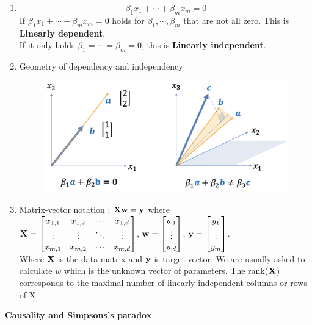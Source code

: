 \begin{enumerate}
    \item \[\beta_1 x_1+\cdots+\beta_m x_m = 0\] 
    If \(\beta_1 x_1+\cdots+\beta_m x_m = 0\) holds for $\beta_1 ,\cdots,\beta_m$ that are not all zero. This is \textbf{Linearly dependent}.\\
    If it only holds \(\beta_1 = \cdots = \beta_m = 0\), this is \textbf{Linearly independent}.
    \item Geometry of dependency and independency
    \begin{figure}[h]
        \centering
        \includegraphics[width=0.70\linewidth]{image/gerolieanr.png}
    \end{figure}
    \item Matrix-vector notation : $\displaystyle \mathbf{Xw} = \mathbf{y}$ where \\
    $\mathbf{X} = \begin{bmatrix}
    x_{1,1} & x_{1,2} & \cdots & x_{1,d} \\
    \vdots & \vdots & \ddots & \vdots \\
    x_{m,1} & x_{m,2} & \cdots & x_{m,d}
    \end{bmatrix}$, $\mathbf{w} = \begin{bmatrix}
        w_1\\ \vdots \\ w_d
    \end{bmatrix}$, $\mathbf{y} = \begin{bmatrix}
        y_1\\ \vdots \\ y_m
    \end{bmatrix}$. \\
    Where $\mathbf{X}$ is the data matrix and $\mathbf{y}$ is target vector. We are usually asked to calculate $w$ which is the unknown vector of parameters. The rank($\mathbf{X}$) corresponds to the maximal number of linearly independent columns or rows of X.
\end{enumerate}
\textbf{Causality and Simpsons's paradox}
